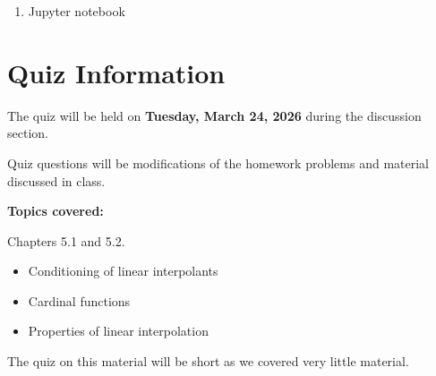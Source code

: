 \documentclass[reqno, answers]{exam}
\begin{document}
\begin{enumerate}
\begin{solution}
              By MVT applied to $f'$ on $[s, u]$, there exists $v \in (t_k, t_{k+1})$ such that:
              $$f'(s) - \frac{y_{k+1} - y_k}{t_{k+1} - t_k} = (s - u)f''(v)$$

              \textbf{(c)} Combining parts (a) and (b):
              $$f(x) - p_n(x) = (x - t_k)(s - u)f''(v)$$

              Since $x, s, u \in (t_k, t_{k+1})$, both $|x - t_k| < h$ and $|s - u| < h$, so:
              $$\|f - p_n\|_\infty \leq Mh^2$$
          \end{solution}

    \item Jupyter notebook

\end{enumerate}


\section*{Quiz Information}

The quiz will be held on {\bf Tuesday, March 24, 2026} during the discussion section.

Quiz questions will be modifications of the homework problems and material discussed in class.

\textbf{Topics covered:}

Chapters 5.1 and 5.2.

\begin{itemize}
    \item Conditioning of linear interpolants
    \item Cardinal functions
    \item Properties of linear interpolation
\end{itemize}

The quiz on this material will be short as we covered very little material.
\end{document}

